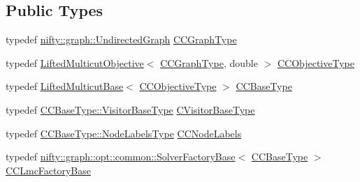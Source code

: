 \subsection*{Public Types}
\begin{DoxyCompactItemize}
\item 
typedef \hyperlink{classnifty_1_1graph_1_1UndirectedGraph}{nifty\+::graph\+::\+Undirected\+Graph} \hyperlink{classnifty_1_1graph_1_1opt_1_1lifted__multicut_1_1PixelWiseLmcConnetedComponentsFusion_3_012_01_4_a7852eb58b25f78c8c4755e42a18bd459}{C\+C\+Graph\+Type}
\item 
typedef \hyperlink{classnifty_1_1graph_1_1opt_1_1lifted__multicut_1_1LiftedMulticutObjective}{Lifted\+Multicut\+Objective}$<$ \hyperlink{classnifty_1_1graph_1_1opt_1_1lifted__multicut_1_1PixelWiseLmcConnetedComponentsFusion_3_012_01_4_a7852eb58b25f78c8c4755e42a18bd459}{C\+C\+Graph\+Type}, double $>$ \hyperlink{classnifty_1_1graph_1_1opt_1_1lifted__multicut_1_1PixelWiseLmcConnetedComponentsFusion_3_012_01_4_a79b4a925ec284a5e76a7769518eb3b0a}{C\+C\+Objective\+Type}
\item 
typedef \hyperlink{classnifty_1_1graph_1_1opt_1_1lifted__multicut_1_1LiftedMulticutBase}{Lifted\+Multicut\+Base}$<$ \hyperlink{classnifty_1_1graph_1_1opt_1_1lifted__multicut_1_1PixelWiseLmcConnetedComponentsFusion_3_012_01_4_a79b4a925ec284a5e76a7769518eb3b0a}{C\+C\+Objective\+Type} $>$ \hyperlink{classnifty_1_1graph_1_1opt_1_1lifted__multicut_1_1PixelWiseLmcConnetedComponentsFusion_3_012_01_4_a4db4caca2bad22f2dff0390dac8dc501}{C\+C\+Base\+Type}
\item 
typedef \hyperlink{classnifty_1_1graph_1_1opt_1_1common_1_1SolverBase_ad9932afb08dd17d375de4b15da9ffaa6}{C\+C\+Base\+Type\+::\+Visitor\+Base\+Type} \hyperlink{classnifty_1_1graph_1_1opt_1_1lifted__multicut_1_1PixelWiseLmcConnetedComponentsFusion_3_012_01_4_a3a84e4f6c88a564b711c7132c03da60b}{C\+Visitor\+Base\+Type}
\item 
typedef \hyperlink{classnifty_1_1graph_1_1opt_1_1common_1_1SolverBase_abefd51561de2fd009f6bed6bef6009ea}{C\+C\+Base\+Type\+::\+Node\+Labels\+Type} \hyperlink{classnifty_1_1graph_1_1opt_1_1lifted__multicut_1_1PixelWiseLmcConnetedComponentsFusion_3_012_01_4_ab41b38aa58faf46ada5a185e801c5ac9}{C\+C\+Node\+Labels}
\item 
typedef \hyperlink{classnifty_1_1graph_1_1opt_1_1common_1_1SolverFactoryBase}{nifty\+::graph\+::opt\+::common\+::\+Solver\+Factory\+Base}$<$ \hyperlink{classnifty_1_1graph_1_1opt_1_1lifted__multicut_1_1PixelWiseLmcConnetedComponentsFusion_3_012_01_4_a4db4caca2bad22f2dff0390dac8dc501}{C\+C\+Base\+Type} $>$ \hyperlink{classnifty_1_1graph_1_1opt_1_1lifted__multicut_1_1PixelWiseLmcConnetedComponentsFusion_3_012_01_4_ab4ad143cd3473408280088a97d5680c5}{C\+C\+Lmc\+Factory\+Base}

\end{DoxyCompactItemize}
